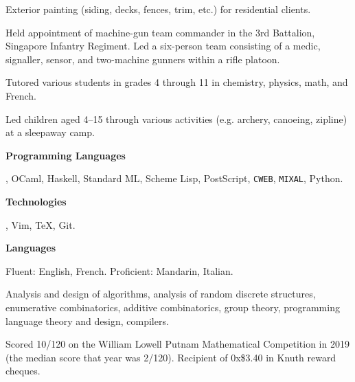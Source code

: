 \smallskip
Exterior painting (siding, decks, fences, trim, etc.) for residential clients.
\medbreak

\smallskip
Held appointment of machine-gun team commander in the 3rd Battalion, Singapore Infantry Regiment.
Led a six-person team consisting of a medic, signaller, sensor, and two-machine gunners within a rifle platoon.
\medbreak

\smallskip
Tutored various students in grades 4 through 11 in chemistry, physics, math, and French.
\medbreak

\smallskip
Led children aged 4--15 through various activities (e.g. archery, canoeing, zipline) at a sleepaway camp.
\medbreak


{\bf Programming Languages}\par
\CEE, OCaml, Haskell, Standard ML, Scheme Lisp, PostScript, {\tt CWEB}, {\tt MIXAL}, Python.
\medbreak

{\bf Technologies}\par
\UNIX, Vim, \TeX, Git.
\medbreak

{\bf Languages}\par
Fluent: English, French. Proficient: Mandarin, Italian.
\medbreak


Analysis and design of algorithms, analysis of random discrete structures, enumerative combinatorics,
additive combinatorics, group theory,
programming language theory and design, compilers.


\parindent=10pt
\thing Scored 10/120 on the William Lowell Putnam Mathematical Competition in 2019
(the median score that year was 2/120).
\smallskip
\thing Recipient of 0x\$3.40 in Knuth reward cheques.
\medbreak

\rightline{\eightrm \datethis}

\filbreak

\bye

